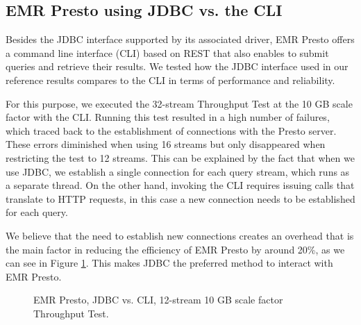 \subsection{EMR Presto using JDBC vs. the CLI}\label{prestoJDBCvsCLI}

Besides the JDBC interface supported by its associated driver, EMR Presto offers a command line interface (CLI) based on REST that also enables to submit queries and retrieve their results. We tested how the JDBC interface used in our reference results compares to the CLI in terms of performance and reliability.

For this purpose, we executed the 32-stream Throughput Test at the 10 GB scale factor with the CLI. Running this test resulted in a high number of failures, which traced back to the establishment of connections with the Presto server. These errors diminished when using 16 streams but only disappeared when restricting the test to 12 streams. This can be explained by the fact that when we use JDBC, we establish a single connection for each query stream, which runs as a separate thread. On the other hand, invoking the CLI requires issuing calls that translate to HTTP requests, in this case a new connection needs to be established for each query.

We believe that the need to establish new connections creates an overhead that is the main factor in reducing the efficiency of EMR Presto by around 20\%, as we can see in Figure \ref{fig:validationExperimentsPrestoCLITputTest}. This makes JDBC the preferred method to interact with EMR Presto.

\begin{figure}
   \begin{center}
   \end{center}
   \caption{EMR Presto, JDBC vs. CLI, 12-stream 10 GB scale factor Throughput Test.}
   \label{fig:validationExperimentsPrestoCLITputTest}
\end{figure}

